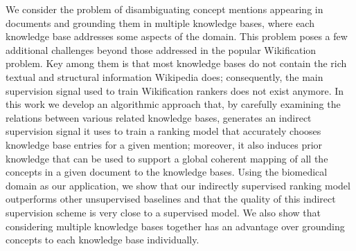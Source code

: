 We consider the problem of disambiguating concept mentions appearing in documents and grounding them in multiple knowledge bases, where each knowledge base addresses some aspects of the domain. This problem poses a few additional challenges beyond those addressed in the popular Wikification problem. Key among them is that most knowledge bases do not contain the rich textual and structural information Wikipedia does; consequently, the main supervision signal used to train Wikification rankers does not exist anymore. In this work we develop an algorithmic approach that, by carefully examining the relations between various related knowledge bases, generates an indirect supervision signal it uses to train a ranking model that accurately chooses knowledge base entries for a given mention; moreover, it also induces prior knowledge that can be used to support a global coherent mapping of all the concepts in a given document to the knowledge bases. Using the biomedical domain as our application, we show that our indirectly supervised ranking model outperforms other unsupervised baselines and that the quality of this indirect supervision scheme is very close to a supervised model. We also show that considering multiple knowledge bases together has an advantage over grounding concepts to each knowledge base individually.